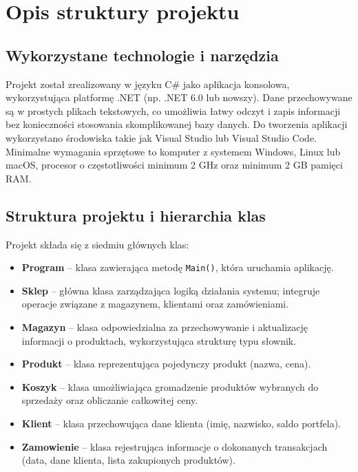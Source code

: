 \chapter{Opis struktury projektu}
\section{Wykorzystane technologie i narzędzia}
Projekt został zrealizowany w języku C\# jako aplikacja konsolowa, wykorzystująca platformę .NET (np. .NET 6.0 lub nowszy). Dane przechowywane są w prostych plikach tekstowych, co umożliwia łatwy odczyt i zapis informacji bez konieczności stosowania skomplikowanej bazy danych. Do tworzenia aplikacji wykorzystano środowiska takie jak Visual Studio lub Visual Studio Code. Minimalne wymagania sprzętowe to komputer z systemem Windows, Linux lub macOS, procesor o częstotliwości minimum 2 GHz oraz minimum 2 GB pamięci RAM.

\section{Struktura projektu i hierarchia klas}
Projekt składa się z siedmiu głównych klas:
\begin{itemize}
    \item \textbf{Program} – klasa zawierająca metodę \texttt{Main()}, która uruchamia aplikację.
    \item \textbf{Sklep} – główna klasa zarządzająca logiką działania systemu; integruje operacje związane z magazynem, klientami oraz zamówieniami.
    \item \textbf{Magazyn} – klasa odpowiedzialna za przechowywanie i aktualizację informacji o produktach, wykorzystująca strukturę typu słownik.
    \item \textbf{Produkt} – klasa reprezentująca pojedynczy produkt (nazwa, cena).
    \item \textbf{Koszyk} – klasa umożliwiająca gromadzenie produktów wybranych do sprzedaży oraz obliczanie całkowitej ceny.
    \item \textbf{Klient} – klasa przechowująca dane klienta (imię, nazwisko, saldo portfela).
    \item \textbf{Zamowienie} – klasa rejestrująca informacje o dokonanych transakcjach (data, dane klienta, lista zakupionych produktów).
\end{itemize}


